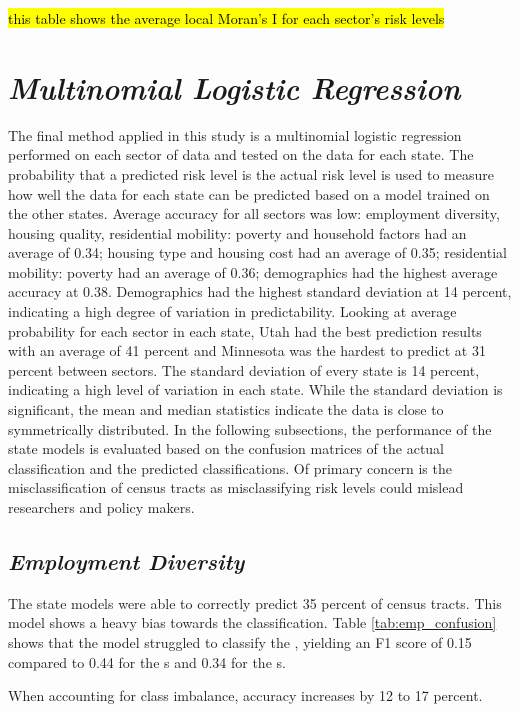 \hl{this table shows the average local Moran's I for each sector's risk levels}


\section{\textit{Multinomial Logistic Regression}}

The final method applied in this study is a multinomial logistic regression performed on each sector of data and tested on the data for each state. The probability that a predicted risk level is the actual risk level is used to measure how well the data for each state can be predicted based on a model trained on the other states. Average accuracy for all sectors was low: employment diversity, housing quality, residential mobility: poverty and household factors had an average of 0.34; housing type and housing cost had an average of 0.35; residential mobility: poverty had an average of 0.36; demographics had the highest average accuracy at 0.38. Demographics had the highest standard deviation at 14 percent, indicating a high degree of variation in predictability. Looking at average probability for each sector in each state, Utah had the best prediction results with an average of 41 percent and Minnesota was the hardest to predict at 31 percent between sectors. The standard deviation of every state is 14 percent, indicating a high level of variation in each state. While the standard deviation is significant, the mean and median statistics indicate the data is close to symmetrically distributed.  In the following subsections, the performance of the state models is evaluated based on the confusion matrices of the actual classification and the predicted classifications. Of primary concern is the misclassification of census tracts as misclassifying risk levels could mislead researchers and policy makers. 

\subsection{\textit{Employment Diversity}}
The state models were able to correctly predict 35 percent of census tracts. This model shows a heavy bias towards the \lrl classification. Table \ref{tab:emp_confusion} shows that the model struggled to classify the \mrl, yielding an F1 score of 0.15 compared to 0.44 for the \lrl s and 0.34 for the \hrl s.

When accounting for class imbalance, accuracy increases by 12 to 17 percent. 




